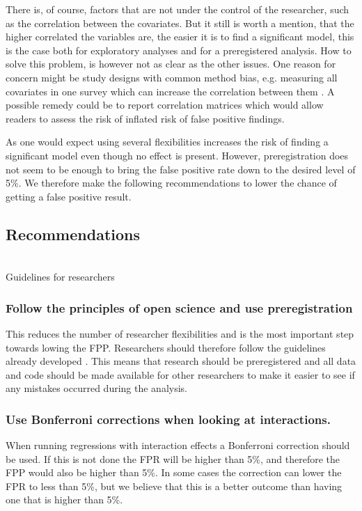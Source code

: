 There is, of course, factors that are not under the control of the researcher, such as the correlation between the covariates. But it still is worth a mention, that the higher correlated the variables are, the easier it is to find a significant model, this is the case both for exploratory analyses and for a preregistered analysis. How to solve this problem, is however not as clear as the other issues. One reason for concern might be study designs with common method bias, e.g. measuring all covariates in one survey which can increase the correlation between them \citep{podsakoff2003}. A possible remedy could be to report correlation matrices which would allow readers to assess the risk of inflated risk of false positive findings.   

As one would expect using several flexibilities increases the risk of finding a significant model even though no effect is present. However, preregistration does not seem to be enough to bring the false positive rate down to the desired level of 5\%. We therefore make the following recommendations to lower the chance of getting a false positive result. 

\subsection{Recommendations}
\hfill\\
Guidelines for researchers 
\hfill\\
\subsubsection{Follow the principles of open science and use preregistration}
This reduces the number of researcher flexibilities and is the most important step towards lowing the FPP. Researchers should therefore follow the guidelines already developed \citep{Nosek2015}. This means that research should be preregistered and all data and code should be made available for other researchers to make it easier to see if any mistakes occurred during the analysis. 
\subsubsection{Use Bonferroni corrections when looking at interactions.}
When running regressions with interaction effects a Bonferroni correction should be used. If this is not done the FPR will be higher than 5\%, and therefore the FPP would also be higher than 5\%. In some cases the correction can lower the FPR to less than 5\%, but we believe that this is a better outcome than having one that is higher than 5\%. 
